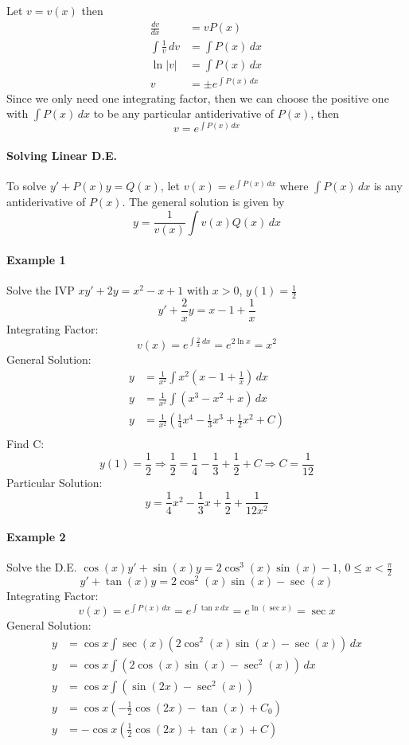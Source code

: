 \documentclass[12pt]{article}
\begin{document}
Let $v = v(x)$ then
\begin{align*} 
     \frac{dv}{dx} &= v P(x) \\
    \int \frac{1}{v} \, dv &= \int P(x)\, dx\, \\
    \ln |v| &= \int P(x) \, dx \\
    v &= \pm e^{\int P(x)\, dx}
\end{align*}
Since we only need one integrating factor, then we can choose the positive one with
$\int P(x) \, dx$ to be any particular antiderivative of $P(x)$, then 
\[
    v = e^{\int P(x) \, dx}
\]

\paragraph{Solving Linear D.E.} To solve $y' + P(x)y = Q(x)$, let $v(x) = e^{\int P(x)\, dx}$ where $\int P(x) \, dx$ is any antiderivative of $P(x)$. 
The general solution is given by 
\[
    y = \frac{1}{v(x)} \int v(x)Q(x)\, dx
\]

\paragraph{Example 1} Solve the IVP $xy' + 2y = x^2 - x + 1$ with $x > 0$, $y(1) = \frac{1}{2}$
\[
    y' + \frac{2}{x}y = x - 1 + \frac{1}{x}
\]
Integrating Factor:
\[
    v(x) = e^{\int \frac{2}{x} \, dx} = e^{2\ln x} = x^2
\]
General Solution:
\begin{align*} 
    y &= \frac{1}{x^2} \int x^2 \left( x - 1 + \frac{1}{x}\right) \, dx \\
    y &= \frac{1}{x^2} \int (x^3 - x^2 + x) \, dx \\
    y &= \frac{1}{x^2} \left(\frac{1}{4}x^{4} - \frac{1}{3}x^3 + \frac{1}{2}x^2 + C \right) \\
\end{align*}
Find C:
\[
    y(1) = \frac{1}{2} \Rightarrow \frac{1}{2} = \frac{1}{4} - \frac{1}{3} + \frac{1}{2} + C \Rightarrow C = \frac{1}{12}
\]
Particular Solution:
\[
    y = \frac{1}{4}x^2 - \frac{1}{3}x + \frac{1}{2} + \frac{1}{12x^2}
\]
\paragraph{Example 2} Solve the D.E. $\cos(x)y' + \sin(x)y = 2\cos^3(x)\sin(x) - 1$, $0 \leq x < \frac{\pi}{2}$
\[
    y' + \tan (x)y = 2\cos^2 (x)\sin (x) - \sec (x)
\]
Integrating Factor:
\[
    v(x) = e^{\int P(x) \, dx} = e^{\int \tan x \, dx} = e^{\ln (\sec x)} = \sec x
\]
General Solution:
\begin{align*} 
     y &= \cos x \int \sec(x)(2\cos^2(x)\sin(x) - \sec(x)) \, dx \\
     y &= \cos x \int (2\cos(x)\sin(x) - \sec^2(x)) \, dx \\
     y &= \cos x \int (\sin(2x) - \sec^2(x)) \\
     y &= \cos x \left( -\frac{1}{2}\cos(2x) - \tan(x) + C_0 \right) \\
     y &= - \cos x \left(\frac{1}{2}\cos(2x) + \tan(x) + C \right) \\
\end{align*}
\end{document}
